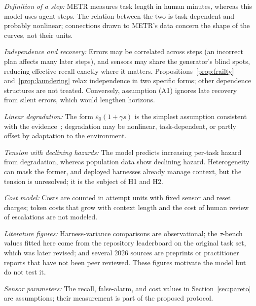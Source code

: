 \documentclass[journal]{IEEEtran}
\begin{document}
\emph{Definition of a step:} METR measures task length in human minutes, whereas this model uses agent steps. The relation between the two is task-dependent and probably nonlinear; connections drawn to METR's data concern the shape of the curves, not their units.

\emph{Independence and recovery:} Errors may be correlated across steps (an incorrect plan affects many later steps), and sensors may share the generator's blind spots, reducing effective recall exactly where it matters. Propositions~\ref{prop:frailty} and~\ref{prop:laundering} relax independence in two specific forms; other dependence structures are not treated. Conversely, assumption (A1) ignores late recovery from silent errors, which would lengthen horizons.

\emph{Linear degradation:} The form $\varepsilon_0(1+\gamma s)$ is the simplest assumption consistent with the evidence~\cite{hong2025}; degradation may be nonlinear, task-dependent, or partly offset by adaptation to the environment.

\emph{Tension with declining hazards:} The model predicts increasing per-task hazard from degradation, whereas population data show declining hazard. Heterogeneity can mask the former, and deployed harnesses already manage context, but the tension is unresolved; it is the subject of H1 and H2.

\emph{Cost model:} Costs are counted in attempt units with fixed sensor and reset charges; token costs that grow with context length and the cost of human review of escalations are not modeled.

\emph{Literature figures:} Harness-variance comparisons are observational; the $\tau$-bench values fitted here come from the repository leaderboard on the original task set, which was later revised; and several 2026 sources are preprints or practitioner reports that have not been peer reviewed. These figures motivate the model but do not test it.

\emph{Sensor parameters:} The recall, false-alarm, and cost values in Section~\ref{sec:pareto} are assumptions; their measurement is part of the proposed protocol.

\end{document}
